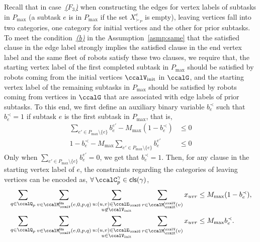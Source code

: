 \documentclass[Afour,sageh,times]{sagej}
\newcommand{\clause}[1]{\mathsf{cls}(#1)}
\begin{document}
{{{{{Recall that in case~\hyperref[edge:vertex3]{\it ($F_3$)}  when constructing the edges for vertex labels of subtasks in $P_{\text{max}}$ (a subtask $e$ is in $P_{\text{max}}$ if the set $X_{\succ_P}^e$ is empty), leaving vertices fall into two categories, one category for initial vertices and the other for prior subtasks. To meet the condition~\hyperref[asmp:b]{\it (b)}  in the Assumption~\ref{asmp:same} that the satisfied clause in the edge label strongly implies the satisfied clause in the end vertex label and the same fleet of robots satisfy these two clauses, we require that, the starting vertex label of the first completed  subtask in $P_{\text{max}}$ should be satisfied by robots coming from the initial vertices $\ccalV_{\text{init}}$ in $\ccalG$, and the starting vertex label of the remaining subtasks in $P_{\text{max}}$ should be satisfied by robots coming from vertices in $\ccalG$ that are associated with edge labels of prior subtasks. To this end, we first define an auxiliary binary variable $b_{e}^{\prec}$ such that $b_{e}^{\prec}= 1$ if subtask $e$ is the first subtask in $P_{\text{max}}$, that is,
\begin{subequations}
  \begin{align}
   \sum_{e' \in P_{\text{max}}\setminus \{e\}} {b}_e^{e'}  - M_{\text{max}} (1 - b_{e}^{\prec}) & \leq 0\\
    1 - b_{e}^{\prec} -  M_{\text{max}}  \sum_{e' \in P_{\text{max}}\setminus \{e\}} {b}_e^{e'}    & \leq 0
  \end{align}
\end{subequations}
Only when $ \sum_{e' \in P_{\text{max}}\setminus \{e\}} {b}_e^{e'}=0$, we get that $b_e^{\prec}=1$. Then, for any clause in the starting vertex label of $e$, the constraints regarding the categories of leaving vertices can be encoded as, $\forall \, \ccalC_p^\gamma \in \clause{\gamma} $,
\begin{subequations}\label{eq:routingforactivation}
  \begin{align}
   & \sum_{q\in \ccalQ_p} \sum_{v \in \ccalM^\mathsf{lits}_{\ccalV}(e,0,p,q)} \sum_{\substack{u: (u,v) \in \ccalE_\ccalG \\ u \not\in \ccalV_{\text{init}}}}   \sum_{r\in \ccalM^\ccalV_{\ccalK}(v)} x_{uvr} \leq M_{\text{max}} (1 - b_e^{\prec}),  \label{eq:routingforactivation_a}\\
   & \sum_{q\in \ccalQ_p} \sum_{v \in \ccalM^\mathsf{lits}_{\ccalV}(e,0,p,q)} \sum_{\substack{u: (u,v) \in \ccalE_\ccalG \\ u \in \ccalV_{\text{init}}}}   \sum_{r\in \ccalM^\ccalV_{\ccalK}(v)} x_{uvr} \leq M_{\text{max}}  b_e^{\prec}.  \label{eq:routingforactivation_b}

\end{align}
\end{subequations}}}}}}
\end{document}

